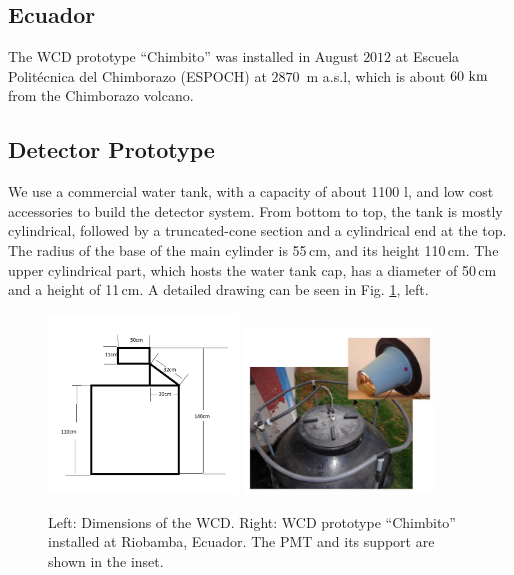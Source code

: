 \subsection{Ecuador}\label{subsec:ecu}

The WCD prototype ``Chimbito'' was installed in August $2012$ at Escuela
Polit\'{e}cnica del Chimborazo (ESPOCH) at $2870$~m a.s.l, which is about $60\
{\rm km}$ from the Chimborazo volcano.

\subsection*{Detector Prototype}

We use a commercial water tank, with a capacity of about 1100 l, and low
cost accessories to build the detector system. From bottom to top, the tank is
mostly cylindrical, followed by a truncated-cone section and a cylindrical end
at the top. The radius of the base of the main cylinder is 55\,cm, and its
height 110\,cm. The upper cylindrical part, which hosts the water tank cap, has
a diameter of 50\,cm and a height of 11\,cm. A detailed drawing can be seen in
Fig. \ref{fig:ecuador-tank}, left.

\begin{figure}[!ht]
  \centering
 \includegraphics[width=0.45\textwidth]{images/ecuador/chimbito_dimensiones}
 \includegraphics[width=0.45\textwidth]{images/ecuador/icrc2013-1208-01}
  \caption{Left: Dimensions of the WCD. Right: WCD prototype ``Chimbito'' installed at Riobamba, Ecuador. The PMT and its support are shown in the inset.}
  \label{fig:ecuador-tank}
 \end{figure}

